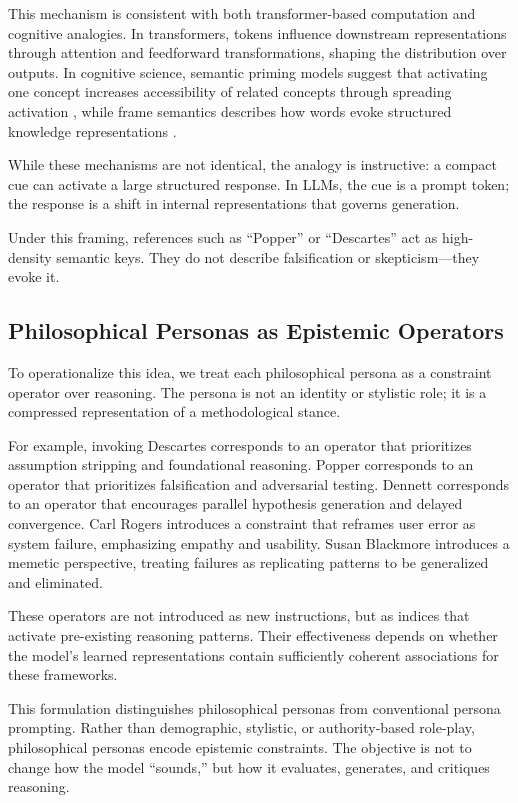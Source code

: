 \documentclass[11pt]{article}
\begin{document}
This mechanism is consistent with both transformer-based computation and cognitive analogies. In transformers, tokens influence downstream representations through attention and feedforward transformations, shaping the distribution over outputs. In cognitive science, semantic priming models suggest that activating one concept increases accessibility of related concepts through spreading activation \cite{collins1975spreading}, while frame semantics describes how words evoke structured knowledge representations \cite{fillmore1982frame}.

While these mechanisms are not identical, the analogy is instructive: a compact cue can activate a large structured response. In LLMs, the cue is a prompt token; the response is a shift in internal representations that governs generation.

Under this framing, references such as “Popper” or “Descartes” act as high-density semantic keys. They do not describe falsification or skepticism—they evoke it.

\subsection{Philosophical Personas as Epistemic Operators}

To operationalize this idea, we treat each philosophical persona as a constraint operator over reasoning. The persona is not an identity or stylistic role; it is a compressed representation of a methodological stance.

For example, invoking Descartes corresponds to an operator that prioritizes assumption stripping and foundational reasoning. Popper corresponds to an operator that prioritizes falsification and adversarial testing. Dennett corresponds to an operator that encourages parallel hypothesis generation and delayed convergence. Carl Rogers introduces a constraint that reframes user error as system failure, emphasizing empathy and usability. Susan Blackmore introduces a memetic perspective, treating failures as replicating patterns to be generalized and eliminated.

These operators are not introduced as new instructions, but as indices that activate pre-existing reasoning patterns. Their effectiveness depends on whether the model’s learned representations contain sufficiently coherent associations for these frameworks.

This formulation distinguishes philosophical personas from conventional persona prompting. Rather than demographic, stylistic, or authority-based role-play, philosophical personas encode epistemic constraints. The objective is not to change how the model “sounds,” but how it evaluates, generates, and critiques reasoning.
\end{document}
